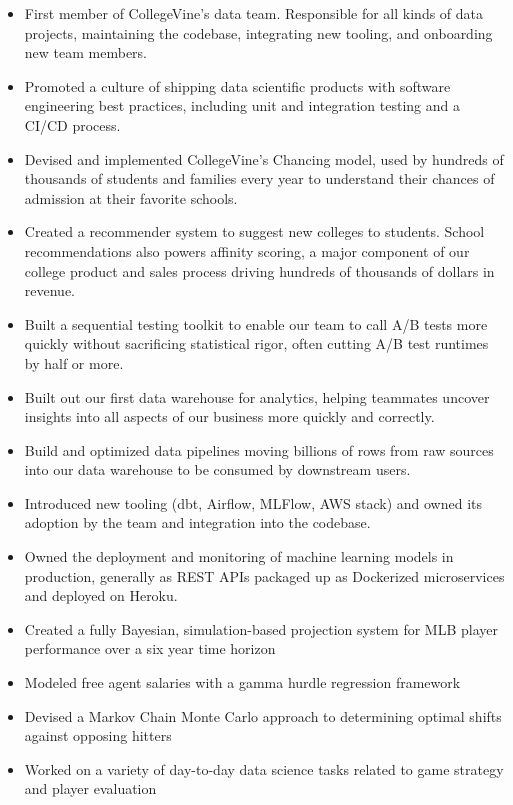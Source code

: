 \documentclass[10pt,a4paper,ragged2e,withhyper]{/Users/matt/documents/GitHub/mrkaye97.github.io/resume/altacv}
\begin{document}
	


	 \makecvheader
		
	
		\begin{itemize}
		\item First member of CollegeVine's data team. Responsible for all kinds of data projects, maintaining the codebase, integrating new tooling, and onboarding new team members. 
		\item Promoted a culture of shipping data scientific products with software engineering best practices, including unit and integration testing and a CI/CD process.
		\item Devised and implemented CollegeVine's Chancing model, used by hundreds of thousands of students and families every year to understand their chances of admission at their favorite schools.
		\item Created a recommender system to suggest new colleges to students. School recommendations also powers affinity scoring, a major component of our college product and sales process driving hundreds of thousands of dollars in revenue.
		\item Built a sequential testing toolkit to enable our team to call A/B tests more quickly without sacrificing statistical rigor, often cutting A/B test runtimes by half or more.
		\item Built out our first data warehouse for analytics, helping teammates uncover insights into all aspects of our business more quickly and correctly.
		\item Build and optimized data pipelines moving billions of rows from raw sources into our data warehouse to be consumed by downstream users.
		\item Introduced new tooling (dbt, Airflow, MLFlow, AWS stack) and owned its adoption by the team and integration into the codebase.
		\item Owned the deployment and monitoring of machine learning models in production, generally as REST APIs packaged up as Dockerized microservices and deployed on Heroku.
		\end{itemize}
		
		\divider
		

		\begin{itemize}
		\item Created a fully Bayesian, simulation-based projection system for MLB player performance over a six year time horizon
		\item Modeled free agent salaries with a gamma hurdle regression framework
		\item Devised a Markov Chain Monte Carlo approach to determining optimal shifts against opposing hitters
		\item Worked on a variety of day-to-day data science tasks related to game strategy and player evaluation
		\end{itemize}
		
\end{document}

